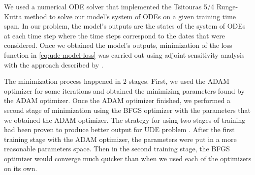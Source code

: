 We used a numerical \gls{ODE} solver that implemented the Tsitouras 5/4 Runge-Kutta method \cite{tsitourasRungeKuttaPairs2011} to solve our model's system of \glspl{ODE} on a given training time span.
In our problem, the model's outputs are the states of the system of \glspl{ODE} at each time step where the time steps correspond to the dates that were considered.
Once we obtained the model's outputs, minimization of the loss function in \autoref{eq:ude-model-loss} was carried out using adjoint sensitivity analysis \cite{maComparisonAutomaticDifferentiation2021} with the approach described by \citeauthor{rackauckasUniversalDifferentialEquations2020} \cite{rackauckasUniversalDifferentialEquations2020}.

The minimization process happened in 2 stages.
First, we used the ADAM optimizer \cite{kingmaAdamMethodStochastic2017} for some iterations and obtained the minimizing parameters found by the ADAM optimizer.
Once the ADAM optimizer finished, we performed a second stage of minimization using the BFGS optimizer \cite{broydenConvergenceClassDoublerank1970, fletcherNewApproachVariable1970, goldfarbFamilyVariablemetricMethods1970, shannoConditioningQuasiNewtonMethods1970} with the parameters that we obtained the ADAM optimizer.
The strategy for using two stages of training had been proven to produce better output for \gls{UDE} problem \cite{rackauckasUniversalDifferentialEquations2020}.
After the first training stage with the ADAM optimizer, the parameters were put in a more reasonable parameters space.
Then in the second training stage, the BFGS optimizer would converge much quicker than when we used each of the optimizers on its own.

